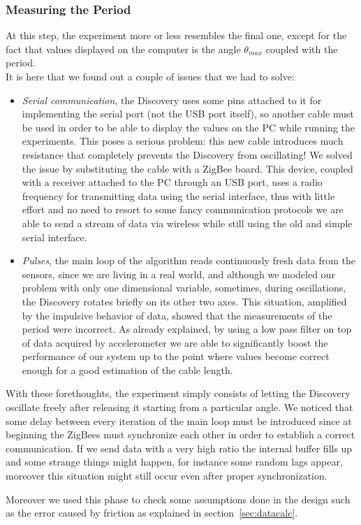 \subsubsection{Measuring the Period}
At this step, the experiment more or less resembles the final one, except for the fact that values displayed on the computer is the angle $\theta_{max}$ coupled with the period. \\
It is here that we found out a couple of issues that we had to solve:
\begin{itemize}
	\item \textit{Serial communication}, the Discovery uses some pins attached to it for implementing the serial port (not the USB port itself), so another cable must be used in order to be able to display the values on the PC while running the experiments. This poses a serious problem: this new cable introduces much resistance that completely prevents the Discovery from oscillating! We solved the issue by substituting the cable with a ZigBee board. This device, coupled with a receiver attached to the PC through an USB port, uses a radio frequency for transmitting data using the serial interface, thus with little effort and no need to resort to some fancy communication protocols we are able to send a stream of data via wireless while still using the old and simple serial interface.
	\item \textit{Pulses}, the main loop of the algorithm reads continuously fresh data from the sensors, since we are living in a real world, and although we modeled our problem with only one dimensional variable, sometimes, during oscillations, the Discovery rotates briefly on its other two axes. This situation, amplified by the impulsive behavior of data, showed that the measurements of the period were incorrect. As already explained, by using a low pass filter on top of data acquired by accelerometer we are able to significantly boost the performance of our system up to the point where values become correct enough for a good estimation of the cable length.
\end{itemize}
With these forethoughts, the experiment simply consists of letting the Discovery oscillate freely after releasing it starting from a particular angle. We noticed that some delay between every iteration of the main loop must be introduced since at beginning the ZigBees must synchronize each other in order to establish a correct communication. If we send data with a very high ratio the internal buffer fills up and some strange things might happen, for instance some random lags appear, moreover this situation might still occur even after proper synchronization.\par
Moreover we used this phase to check some assumptions done in the design such as the error caused by friction as explained in section~\ref{sec:datacalc}.

